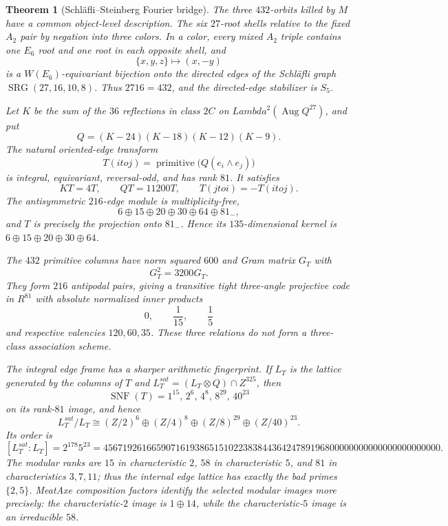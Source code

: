 \documentclass[12pt,a4paper]{article}
\def\mathbb#1{#1}%
\def\mathrm#1{#1}%
\def\mathbf#1{#1}%
\def\Lambda{Lambda}%
\def\cdot{ }%
\def\to{ to }%
\newtheorem{theorem}{Theorem}[section]
\theoremstyle{definition}
\begin{document}
\begin{theorem}[Schl\"afli--Steinberg Fourier bridge]
\label{thm:schlaefli-steinberg-fourier-bridge}
The three $432$-orbits killed by $M$ have a common object-level
description.  The six $27$-root shells relative to the fixed $A_2$ pair by
negation into three colors.  In a color, every mixed $A_2$ triple contains
one $E_6$ root and one root in each opposite shell, and
\[
 \{x,y,z\}\longmapsto(x,-y)
\]
is a $W(E_6)$-equivariant bijection onto the directed edges of the
Schl\"afli graph $\operatorname{SRG}(27,16,10,8)$.  Thus
$27\cdot16=432$, and the directed-edge stabilizer is $S_5$.

Let $K$ be the sum of the $36$ reflections in class $2C$ on
$\Lambda^2(\operatorname{Aug}\mathbb Q^{27})$, and put
\[
 Q=(K-24)(K-18)(K-12)(K-9).
\]
The natural oriented-edge transform
\[
 T(i\to j)=\operatorname{primitive}\!\bigl(Q(e_i\wedge e_j)\bigr)
\]
is integral, equivariant, reversal-odd, and has rank $81$.  It satisfies
\[
 KT=4T,\qquad QT=11200T,\qquad T(j\to i)=-T(i\to j).
\]
The antisymmetric $216$-edge module is multiplicity-free,
\[
 6\oplus15\oplus20\oplus30\oplus64\oplus81_-,
\]
and $T$ is precisely the projection onto $81_-$.  Hence its
$135$-dimensional kernel is
$6\oplus15\oplus20\oplus30\oplus64$.

The $432$ primitive columns have norm squared $600$ and Gram matrix $G_T$
with
\[
 \boxed{G_T^2=3200G_T}.
\]
They form $216$ antipodal pairs, giving a transitive tight three-angle
projective code in $\mathbb R^{81}$ with absolute normalized inner
products
\[
 0,\qquad \frac1{15},\qquad \frac15
\]
and respective valencies $120,60,35$.  These three relations do not form
a three-class association scheme.

The integral edge frame has a sharper arithmetic fingerprint.  If $L_T$
is the lattice generated by the columns of $T$ and
$L_T^{\mathrm{sat}}=(L_T\otimes\mathbb Q)\cap\mathbb Z^{325}$, then
\[
 \operatorname{SNF}(T)
   =1^{15},\,2^6,\,4^8,\,8^{29},\,40^{23}
\]
on its rank-$81$ image, and hence
\[
 L_T^{\mathrm{sat}}/L_T\cong
 (\mathbb Z/2)^6\oplus(\mathbb Z/4)^8\oplus
 (\mathbb Z/8)^{29}\oplus(\mathbb Z/40)^{23}.
\]
Its order is
\[
 [L_T^{\mathrm{sat}}:L_T]=2^{178}5^{23}
 =4567192616659071619386515102238384436424789196800000000000000000000000.
\]
The modular ranks are $15$ in characteristic $2$, $58$ in
characteristic $5$, and $81$ in characteristics $3,7,11$; thus the
internal edge lattice has exactly the bad primes $\{2,5\}$.  MeatAxe
composition factors identify the selected modular images more precisely:
the characteristic-$2$ image is $\mathbf1\oplus\mathbf{14}$, while the
characteristic-$5$ image is an irreducible $\mathbf{58}$.


\end{theorem}
\end{document}
